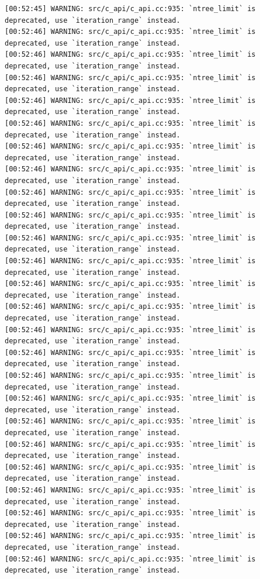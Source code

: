 \documentclass[
  letterpaper,
  DIV=11,
  numbers=noendperiod]{scrartcl}
\begin{document}
\begin{verbatim}
[00:52:45] WARNING: src/c_api/c_api.cc:935: `ntree_limit` is deprecated, use `iteration_range` instead.
[00:52:46] WARNING: src/c_api/c_api.cc:935: `ntree_limit` is deprecated, use `iteration_range` instead.
[00:52:46] WARNING: src/c_api/c_api.cc:935: `ntree_limit` is deprecated, use `iteration_range` instead.
[00:52:46] WARNING: src/c_api/c_api.cc:935: `ntree_limit` is deprecated, use `iteration_range` instead.
[00:52:46] WARNING: src/c_api/c_api.cc:935: `ntree_limit` is deprecated, use `iteration_range` instead.
[00:52:46] WARNING: src/c_api/c_api.cc:935: `ntree_limit` is deprecated, use `iteration_range` instead.
[00:52:46] WARNING: src/c_api/c_api.cc:935: `ntree_limit` is deprecated, use `iteration_range` instead.
[00:52:46] WARNING: src/c_api/c_api.cc:935: `ntree_limit` is deprecated, use `iteration_range` instead.
[00:52:46] WARNING: src/c_api/c_api.cc:935: `ntree_limit` is deprecated, use `iteration_range` instead.
[00:52:46] WARNING: src/c_api/c_api.cc:935: `ntree_limit` is deprecated, use `iteration_range` instead.
[00:52:46] WARNING: src/c_api/c_api.cc:935: `ntree_limit` is deprecated, use `iteration_range` instead.
[00:52:46] WARNING: src/c_api/c_api.cc:935: `ntree_limit` is deprecated, use `iteration_range` instead.
[00:52:46] WARNING: src/c_api/c_api.cc:935: `ntree_limit` is deprecated, use `iteration_range` instead.
[00:52:46] WARNING: src/c_api/c_api.cc:935: `ntree_limit` is deprecated, use `iteration_range` instead.
[00:52:46] WARNING: src/c_api/c_api.cc:935: `ntree_limit` is deprecated, use `iteration_range` instead.
[00:52:46] WARNING: src/c_api/c_api.cc:935: `ntree_limit` is deprecated, use `iteration_range` instead.
[00:52:46] WARNING: src/c_api/c_api.cc:935: `ntree_limit` is deprecated, use `iteration_range` instead.
[00:52:46] WARNING: src/c_api/c_api.cc:935: `ntree_limit` is deprecated, use `iteration_range` instead.
[00:52:46] WARNING: src/c_api/c_api.cc:935: `ntree_limit` is deprecated, use `iteration_range` instead.
[00:52:46] WARNING: src/c_api/c_api.cc:935: `ntree_limit` is deprecated, use `iteration_range` instead.
[00:52:46] WARNING: src/c_api/c_api.cc:935: `ntree_limit` is deprecated, use `iteration_range` instead.
[00:52:46] WARNING: src/c_api/c_api.cc:935: `ntree_limit` is deprecated, use `iteration_range` instead.
[00:52:46] WARNING: src/c_api/c_api.cc:935: `ntree_limit` is deprecated, use `iteration_range` instead.
[00:52:46] WARNING: src/c_api/c_api.cc:935: `ntree_limit` is deprecated, use `iteration_range` instead.
[00:52:46] WARNING: src/c_api/c_api.cc:935: `ntree_limit` is deprecated, use `iteration_range` instead.

\end{verbatim}
\end{document}
